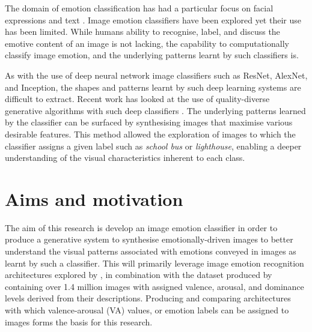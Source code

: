 \documentclass{article}
\begin{document}
The domain of emotion classification has had a particular focus on facial expressions and text \citep{cambria2016affective, warriner2013norms}.
Image emotion classifiers have been explored \citep{kim2018building, machajdik2010affective, chen2015learning, chen2014deepsentibank} yet their use has been limited.
While humans ability to recognise, label, and discuss the emotive content of an image is not lacking, the capability to computationally classify image emotion, and the underlying patterns learnt by such classifiers is.

As with the use of deep neural network image classifiers such as ResNet, AlexNet, and Inception, the shapes and patterns learnt by such deep learning systems are difficult to extract.
Recent work has looked at the use of quality-diverse generative algorithms with such deep classifiers \citep{nguyen2015deep, nguyen2015innovation}.
The underlying patterns learned by the classifier can be surfaced by synthesising images that maximise various desirable features.
This method allowed the exploration of images to which the classifier assigns a given label such as \textit{school bus} or \textit{lighthouse}, enabling a deeper understanding of the visual characteristics inherent to each class.

\section{Aims and motivation}
The aim of this research is develop an image emotion classifier in order to produce a generative system to synthesise emotionally-driven images to better understand the visual patterns associated with emotions conveyed in images as learnt by such a classifier.
This will primarily leverage image emotion recognition architectures explored by \citet{kim2018building}, in combination with the dataset produced by \citet{zhao2016predicting} containing over 1.4 million images with assigned valence, arousal, and dominance levels derived from their descriptions.
Producing and comparing architectures with which valence-arousal (VA) values, or emotion labels can be assigned to images forms the basis for this research.
\end{document}
